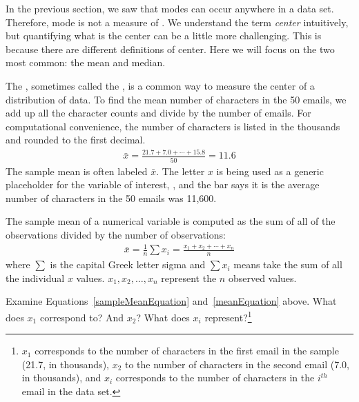 In the previous section, we saw that modes can occur anywhere in a data set. Therefore, mode is not a measure of . We understand the term \emph{center} intuitively, but quantifying what is the center can be a little more challenging. This is because there are different definitions of center. Here we will focus on the two most common: the mean and median.

The , sometimes called the , is a common way to measure the center of a distribution of data. To find the mean number of characters in the 50 emails, we add up all the character counts and divide by the number of emails. For computational convenience, the number of characters is listed in the thousands and rounded to the first decimal.
\begin{eqnarray}
\bar{x} = \frac{21.7 + 7.0 + \cdots + 15.8}{50} = 11.6
\label{sampleMeanEquation}
\end{eqnarray}
The sample mean is often labeled $\bar{x}$. The letter $x$ is being used as a generic placeholder for the variable of interest, , and the bar says it is the average number of characters in the 50 emails was 11,600.

\begin{termBox}{
The sample mean of a numerical variable is computed as the sum of all of the observations divided by the number of observations:
\begin{eqnarray}
\bar{x} = \frac{1}{n}\sum{x_{i}} = \frac{x_1+x_2+\cdots+x_n}{n}
\label{meanEquation}
\end{eqnarray}
where $\sum$ is the capital Greek letter sigma and $\sum{x_{i}}$ means take the sum of all the individual $x$ values.
 $x_1, x_2, \dots, x_n$ represent the $n$ observed values.}
\end{termBox}

\begin{exercise}
Examine Equations~\eqref{sampleMeanEquation} and~\eqref{meanEquation} above. What does $x_1$ correspond to? And $x_2$? What does $x_i$ represent?\footnote{$x_1$ corresponds to the number of characters in the first email in the sample (21.7, in thousands), $x_2$ to the number of characters in the second email (7.0, in thousands), and $x_i$ corresponds to the number of characters in the $i^{th}$ email in the data set.}
\end{exercise}

